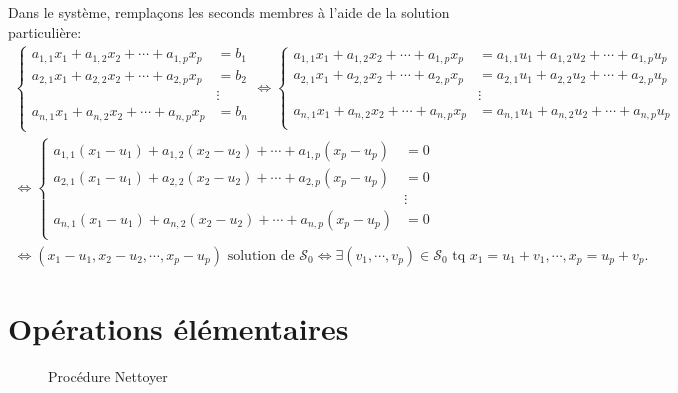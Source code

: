 \begin{demo}
 Dans le système, remplaçons les seconds membres à l'aide de la solution particulière:
\begin{multline*}
 \left\lbrace 
\begin{aligned}
 a_{1,1}x_1 + a_{1,2}x_2 + \cdots + a_{1,p}x_p &= b_1\\
 a_{2,1}x_1 + a_{2,2}x_2 + \cdots + a_{2,p}x_p &= b_2\\
                                               &\vdots \\
 a_{n,1}x_1 + a_{n,2}x_2 + \cdots + a_{n,p}x_p &= b_n\\
\end{aligned}
\right. 
\Leftrightarrow 
 \left\lbrace 
\begin{aligned}
 a_{1,1}x_1 + a_{1,2}x_2 + \cdots + a_{1,p}x_p &= a_{1,1}u_1 + a_{1,2}u_2 + \cdots + a_{1,p}u_p\\
 a_{2,1}x_1 + a_{2,2}x_2 + \cdots + a_{2,p}x_p &= a_{2,1}u_1 + a_{2,2}u_2 + \cdots + a_{2,p}u_p\\
                                               &\vdots \\
 a_{n,1}x_1 + a_{n,2}x_2 + \cdots + a_{n,p}x_p &= a_{n,1}u_1 + a_{n,2}u_2 + \cdots + a_{n,p}u_p\\
\end{aligned}
\right. \\
\Leftrightarrow
 \left\lbrace 
\begin{aligned}
 a_{1,1}(x_1 - u_1) + a_{1,2}(x_2 - u_2) + \cdots + a_{1,p}(x_p - u_p) &= 0\\
 a_{2,1}(x_1 - u_1) + a_{2,2}(x_2 - u_2) + \cdots + a_{2,p}(x_p - u_p) &= 0\\
                                               &\vdots \\
 a_{n,1}(x_1 - u_1) + a_{n,2}(x_2 - u_2) + \cdots + a_{n,p}(x_p - u_p) &= 0\\
\end{aligned}
\right. \\
\Leftrightarrow (x_1 - u_1, x_2 - u_2, \cdots, x_p - u_p) \text{ solution de } \mathcal{S}_0
\Leftrightarrow \exists (v_1,\cdots,v_p) \in \mathcal{S}_0 \text{ tq }x_1 = u_1 + v_1, \cdots, x_p = u_p + v_p.
\end{multline*}

\end{demo}

\section{Opérations élémentaires}
\begin{figure}[ht]
 \centering
 
 \caption{Procédure \og Nettoyer\fg}
 \label{fig:C9433_1}
\end{figure}

